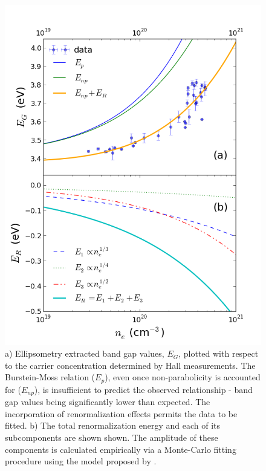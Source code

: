 \documentclass[final,5p,times]{elsarticle}
\begin{document}
\begin{figure}[ht]
\vspace{-1cm}
\centering
\includegraphics[width = 1\columnwidth]{figure5.png}
\caption{\label{fig:4} a) Ellipsometry extracted band gap values, $E_G$, plotted with respect to the carrier concentration determined by Hall measurements. The Burstein-Moss relation ($E_p$), even once non-parabolicity is accounted for ($E_{np}$), is insufficient to predict the observed relationship - band gap values being significantly lower than expected. The incorporation of renormalization effects permits the data to be fitted. b) The total renormalization energy and each of its subcomponents are shown shown. The amplitude of these components is calculated empirically via a Monte-Carlo fitting procedure using the model proposed by \cite{Jain1990}. }
\end{figure}
\end{document}
